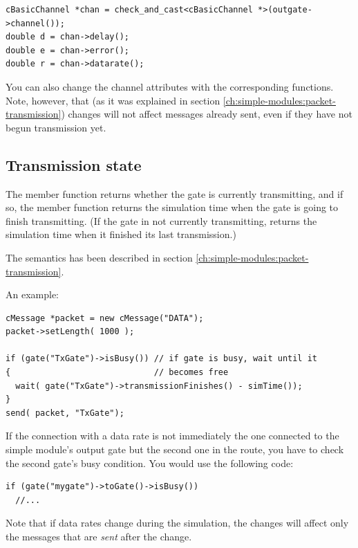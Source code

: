 \begin{verbatim}
cBasicChannel *chan = check_and_cast<cBasicChannel *>(outgate->channel());
double d = chan->delay();
double e = chan->error();
double r = chan->datarate();
\end{verbatim}

You can also change the channel attributes with the corresponding
 functions. Note, however, that (as it was explained in
section \ref{ch:simple-modules:packet-transmission})
changes will not affect messages already sent, even if they have not
begun transmission yet.



\subsection{Transmission state}
\label{ch:simple-modules:cgate-transmission-state}

The  member function returns whether the gate
is currently transmitting, and if so, the
 member function
returns the simulation time when the gate is going to finish
transmitting. (If the gate in not currently transmitting,
 returns the simulation time
when it finished its last transmission.)

The semantics has been described in section
\ref{ch:simple-modules:packet-transmission}.

An example:

\begin{verbatim}
cMessage *packet = new cMessage("DATA");
packet->setLength( 1000 );

if (gate("TxGate")->isBusy()) // if gate is busy, wait until it
{                             // becomes free
  wait( gate("TxGate")->transmissionFinishes() - simTime());
}
send( packet, "TxGate");
\end{verbatim}

If the connection with a data rate is not immediately the one
connected to the simple module's output gate but
the second one in the route, you have to check the second gate's busy
condition.  You would use the following code:

\begin{verbatim}
if (gate("mygate")->toGate()->isBusy())
  //...
\end{verbatim}

Note that if data rates change during the
simulation, the changes will affect only the messages that are
\textit{sent} after the change.




